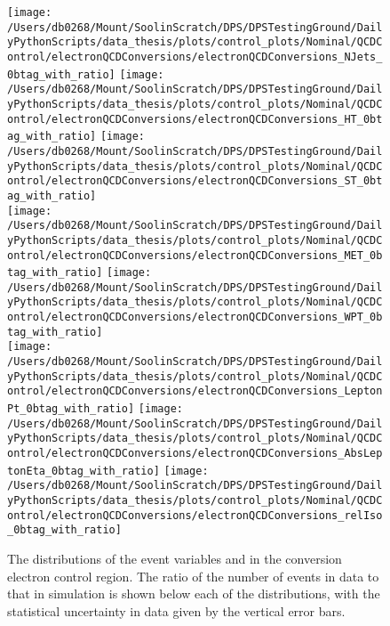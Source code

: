 \begin{figure}[hp]
	\centering
	\texttt{[image: /Users/db0268/Mount/SoolinScratch/DPS/DPSTestingGround/DailyPythonScripts/data\_thesis/plots/control\_plots/Nominal/QCDControl/electronQCDConversions/electronQCDConversions\_NJets\_0btag\_with\_ratio]}
	\texttt{[image: /Users/db0268/Mount/SoolinScratch/DPS/DPSTestingGround/DailyPythonScripts/data\_thesis/plots/control\_plots/Nominal/QCDControl/electronQCDConversions/electronQCDConversions\_HT\_0btag\_with\_ratio]}
	\texttt{[image: /Users/db0268/Mount/SoolinScratch/DPS/DPSTestingGround/DailyPythonScripts/data\_thesis/plots/control\_plots/Nominal/QCDControl/electronQCDConversions/electronQCDConversions\_ST\_0btag\_with\_ratio]} \\
	\texttt{[image: /Users/db0268/Mount/SoolinScratch/DPS/DPSTestingGround/DailyPythonScripts/data\_thesis/plots/control\_plots/Nominal/QCDControl/electronQCDConversions/electronQCDConversions\_MET\_0btag\_with\_ratio]}
	\texttt{[image: /Users/db0268/Mount/SoolinScratch/DPS/DPSTestingGround/DailyPythonScripts/data\_thesis/plots/control\_plots/Nominal/QCDControl/electronQCDConversions/electronQCDConversions\_WPT\_0btag\_with\_ratio]} \\
	\texttt{[image: /Users/db0268/Mount/SoolinScratch/DPS/DPSTestingGround/DailyPythonScripts/data\_thesis/plots/control\_plots/Nominal/QCDControl/electronQCDConversions/electronQCDConversions\_LeptonPt\_0btag\_with\_ratio]} 
	\texttt{[image: /Users/db0268/Mount/SoolinScratch/DPS/DPSTestingGround/DailyPythonScripts/data\_thesis/plots/control\_plots/Nominal/QCDControl/electronQCDConversions/electronQCDConversions\_AbsLeptonEta\_0btag\_with\_ratio]}
	\texttt{[image: /Users/db0268/Mount/SoolinScratch/DPS/DPSTestingGround/DailyPythonScripts/data\_thesis/plots/control\_plots/Nominal/QCDControl/electronQCDConversions/electronQCDConversions\_relIso\_0btag\_with\_ratio]}
	\caption[The distributions of the event variables and \Irel{} in the conversion electron control region. The ratio of the number of events in data to that in simulation is shown below each of the distributions, with the statistical uncertainty in data given by the vertical error bars.]{The distributions of the event variables and \Irel{} in the conversion electron control region. The ratio of the number of events in data to that in simulation is shown below each of the distributions, with the statistical uncertainty in data given by the vertical error bars.}
	\label{fig:QCDeConv}
\end{figure}
